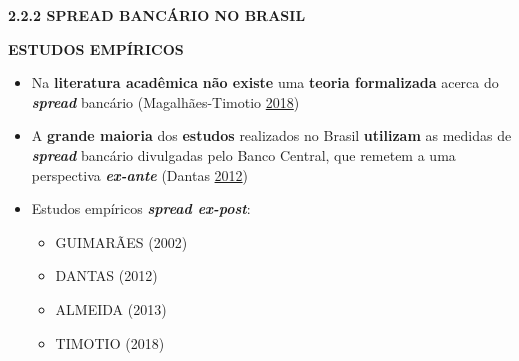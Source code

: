 \documentclass[ignorenonframetext,aspectratio=169,ignorenonframetext]{beamer}
\providecommand{\tightlist}{%
  \setlength{\itemsep}{0pt}\setlength{\parskip}{0pt}}
\begin{document}
\begin{frame}{\textbf{2.2.2 SPREAD BANCÁRIO NO BRASIL}}
\protect\hypertarget{spread-bancuxe1rio-no-brasil-2}{}

\textbf{ESTUDOS EMPÍRICOS}

\begin{itemize}
\item
  Na \textbf{literatura acadêmica} \textbf{não existe} uma
  \textbf{teoria formalizada} acerca do \textbf{\emph{spread}} bancário
  (Magalhães-Timotio \protect\hyperlink{ref-timotio:2018}{2018})
\item
  A \textbf{grande maioria} dos \textbf{estudos} realizados no Brasil
  \textbf{utilizam} as medidas de \textbf{\emph{spread}} bancário
  divulgadas pelo Banco Central, que remetem a uma perspectiva
  \textbf{\emph{ex-ante}} (Dantas
  \protect\hyperlink{ref-dantas:2012}{2012})
\item
  Estudos empíricos \textbf{\emph{spread ex-post}}:

  \begin{itemize}
  \tightlist
  \item
    GUIMARÃES (2002)
  \item
    DANTAS (2012)
  \item
    ALMEIDA (2013)
  \item
    TIMOTIO (2018)
  \end{itemize}
\end{itemize}

\end{frame}
\end{document}
